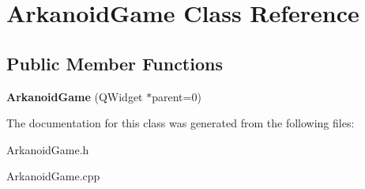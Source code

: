 \hypertarget{classArkanoidGame}{\section{\-Arkanoid\-Game \-Class \-Reference}
\label{classArkanoidGame}
}
\subsection*{\-Public \-Member \-Functions}
\begin{DoxyCompactItemize}
\item 
\hypertarget{classArkanoidGame_aadf3474b516d50e163b6a7ee10154ea3}{{\bfseries \-Arkanoid\-Game} (\-Q\-Widget $\ast$parent=0)}\label{classArkanoidGame_aadf3474b516d50e163b6a7ee10154ea3}

\end{DoxyCompactItemize}


\-The documentation for this class was generated from the following files\-:\begin{DoxyCompactItemize}
\item 
\-Arkanoid\-Game.\-h\item 
\-Arkanoid\-Game.\-cpp\end{DoxyCompactItemize}
